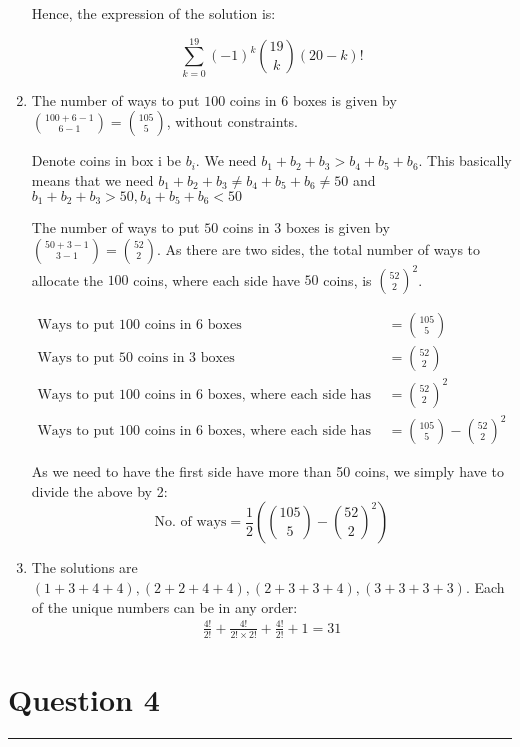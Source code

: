 \documentclass{article}
\begin{document}
\begin{enumerate}[label=(\alph*)]
          Hence, the expression of the solution is:

          \[
              \sum_{k=0}^{19}(-1)^k\binom{19}k(20-k)!
          \]

    \item The number of ways to put $100$ coins in $6$ boxes is given by $\binom{100+6-1}{6-1} = \binom{105}{5}$, without constraints.

          Denote coins in box i be $b_i$. We need $b_1+b_2+b_3 > b_4+b_5+b_6$. This basically means that we need $b_1+b_2+b_3 \neq b_4+b_5+b_6 \neq 50$ and $b_1+b_2+b_3 > 50, b_4+b_5+b_6 < 50$

          The number of ways to put $50$ coins in $3$ boxes is given by $\binom{50+3-1}{3-1} = \binom{52}{2}$. As there are two sides, the total number of ways to allocate the $100$ coins, where each side have $50$ coins, is $\binom{52}{2}^2$.

          \begin{align*}
              \text{Ways to put 100 coins in 6 boxes}                                         & = \binom{105}{5}                   \\
              \text{Ways to put 50 coins in 3 boxes}                                          & = \binom{52}{2}                    \\
              \text{Ways to put 100 coins in 6 boxes, where each side has 50 coins}           & = \binom{52}{2}^2                  \\
              \text{Ways to put 100 coins in 6 boxes, where each side has more than 50 coins} & = \binom{105}{5} - \binom{52}{2}^2
          \end{align*}

          As we need to have the first side have more than 50 coins, we simply have to divide the above by 2:
          \[
              \text{No. of ways}=\frac{1}{2} \left( \binom{105}{5} - \binom{52}{2}^2 \right)
          \]

    \item The solutions are $(1+3+4+4), (2+2+4+4), (2+3+3+4), (3+3+3+3)$. Each of the unique numbers can be in any order:
          \begin{align*}
              \frac{4!}{2!} + \frac{4!}{2! \times 2!} + \frac{4!}{2!} + 1 = 31
          \end{align*}
\end{enumerate}

\newpage
\section*{Question 4}
\hrule
\vspace{0.5cm}
\end{document}
